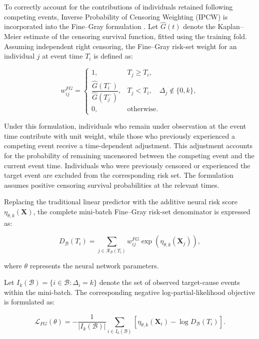 \documentclass[a4paper,twoside,12pt]{report}
\begin{document}
To correctly account for the contributions of individuals retained following competing events, Inverse Probability of Censoring Weighting (IPCW) is incorporated into the Fine--Gray formulation \citep{FineGray1999}. Let $\widehat{G}(t)$ denote the Kaplan--Meier estimate of the censoring survival function, fitted using the training fold. Assuming independent right censoring, the Fine--Gray risk-set weight for an individual $j$ at event time $T_i$ is defined as:

\begin{equation}
w_{ij}^{FG}
=
\begin{cases}
1,
& T_j \geq T_i, \\[6pt]
\dfrac{\widehat{G}(T_i^-)}
{\widehat{G}(T_j^-)},
& T_j < T_i,\quad
\Delta_j \notin \{0,k\}, \\[10pt]
0,
& \text{otherwise}.
\end{cases}
\end{equation}

Under this formulation, individuals who remain under observation at the event time contribute with unit weight, while those who previously experienced a competing event receive a time-dependent adjustment. This adjustment accounts for the probability of remaining uncensored between the competing event and the current event time. Individuals who were previously censored or experienced the target event are excluded from the corresponding risk set. The formulation assumes positive censoring survival probabilities at the relevant times.

Replacing the traditional linear predictor with the additive neural risk score $\eta_{\theta,k}(\boldsymbol{X})$, the complete mini-batch Fine--Gray risk-set denominator is expressed as:

\begin{equation}
D_{\mathcal{B}}(T_i)
=
\sum_{j \in \mathcal{R}_{\mathcal{B}}(T_i)}
w_{ij}^{FG}
\exp\left(\eta_{\theta,k}(\boldsymbol{X}_j)\right),
\end{equation}

where $\theta$ represents the neural network parameters.

Let $I_k(\mathcal{B}) = \{i \in \mathcal{B} : \Delta_i = k\}$ denote the set of observed target-cause events within the mini-batch. The corresponding negative log-partial-likelihood objective is formulated as:

\begin{equation}
\mathcal{L}_{FG}(\theta)
=
-\frac{1}{|I_k(\mathcal{B})|}
\sum_{i \in I_k(\mathcal{B})}
\left[
\eta_{\theta,k}(\boldsymbol{X}_i)
-
\log D_{\mathcal{B}}(T_i)
\right].
\end{equation}
\end{document}
